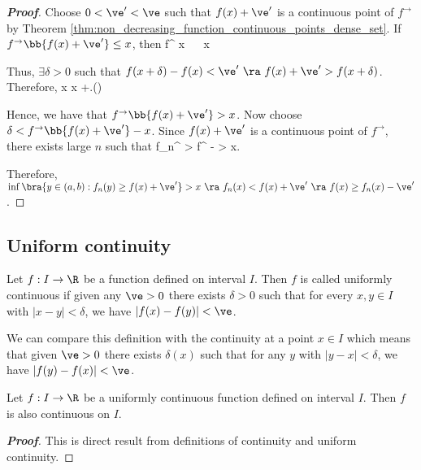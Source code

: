 \begin{proof}[\bf Proof]


Choose $0<\ve'<\ve$ such that $f(x)+\ve'$ is a continuous point of $f^{\to}$ by Theorem \ref{thm:non_decreasing_function_continuous_points_dense_set}. If $f^{\to}\bb{f(x)+\ve'} \leq x$, then
\be
f^{\to} \leq x \ \ra\ \inf{} \leq x
\ee

Thus, $\exists \delta >0$ such that $f(x+\delta)-f(x)< \ve' \ \ra \ f(x)+\ve' > f(x+\delta)$. Therefore,
\be
x\geq \inf{} \geq x +\delta.\qquad ()
\ee

Hence, we have that $f^{\to}\bb{f(x)+\ve'} > x$. Now choose $\delta < f^{\to}\bb{f(x)+\ve'}-x$. Since $f(x)+\ve'$ is a continuous point of $f^{\to}$, there exists large $n$ such that
\be
f_n^{\to} > f^{\to} - \delta > x.
\ee

Therefore, $\inf\bra{y\in (a,b): f_n(y) \geq f(x)+\ve'} > x \ \ra\  f_n(x) < f(x)+\ve' \ \ra\ f(x) \geq f_n(x) - \ve'$.
\end{proof}


\subsection{Uniform continuity}

\begin{definition}\label{def:uniformly_continuous_function_real}
Let $f:I\to \R$ be a function defined on interval $I$. Then $f$ is called uniformly continuous if given any $\ve>0$ there exists $\delta>0$ such that for every $x,y\in I$ with $|x-y|<\delta$, we have $|f(x)-f(y)|<\ve$.
\end{definition}

\begin{remark}
We can compare this definition with the continuity at a point $x\in I$ which means that given $\ve>0$ there exists $\delta(x)$ such that for any $y$ with $|y-x|<\delta$, we have $|f(y)-f(x)|<\ve$.
\end{remark}

\begin{proposition}
Let $f:I\to \R$ be a uniformly continuous function defined on interval $I$. Then $f$ is also continuous on $I$.
\end{proposition}

\begin{proof}[\bf Proof]
This is direct result from definitions of continuity and uniform continuity.
\end{proof}



